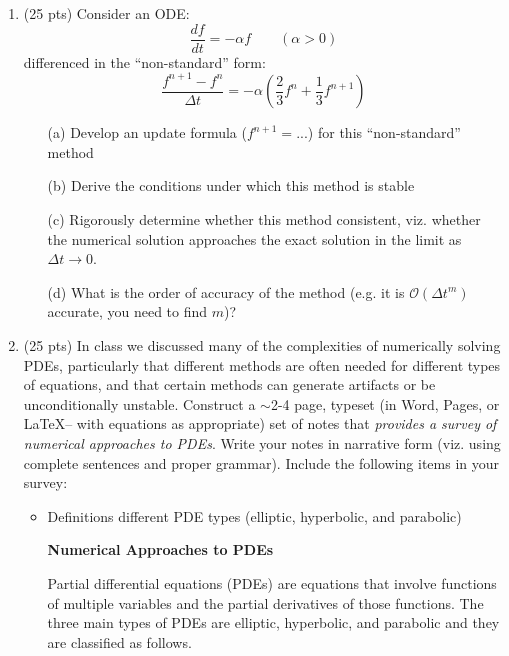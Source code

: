 \documentclass{article}
\begin{document}
\begin{enumerate}

  \item (25 pts) Consider an ODE:  
  \begin{equation}
    \frac{d f}{d t} = -\alpha f \qquad (\alpha > 0)
  \end{equation}
  differenced in the ``non-standard'' form:
  \begin{equation}
    \frac{f^{n+1}-f^n}{\Delta t} = - \alpha \left( \frac{2}{3} f^n + \frac{1}{3} f^{n+1} \right)
  \end{equation}  
  \begin{enumerate}
    \item[(a)] Develop an update formula ($f^{n+1}=...$) for this ``non-standard'' method
    \item[(b)] Derive the conditions under which this method is stable
    \item[(c)] Rigorously determine whether this method consistent, viz. whether the numerical solution approaches the exact solution in the limit as $\Delta t \rightarrow 0$.
    \item[(d)] What is the order of accuracy of the method (e.g. it is $\mathcal{O}(\Delta t^m)$ accurate, you need to find $m$)?
  \end{enumerate}

  \item (25 pts) In class we discussed many of the complexities of numerically solving PDEs, particularly that different methods are often needed for different types of equations, and that certain methods can generate artifacts or be unconditionally unstable.  Construct a $\sim$2-4 page, typeset (in Word, Pages, or \LaTeX -- with equations as appropriate) set of notes that \emph{provides a survey of numerical approaches to PDEs}.  Write your notes in narrative form (viz. using complete sentences and proper grammar). Include the following items in your survey:
    \begin{itemize}
      \item Definitions different PDE types (elliptic, hyperbolic, and parabolic)
      
      \textbf{Numerical Approaches to PDEs}
      
      Partial differential equations (PDEs) are equations that involve functions of multiple variables and the partial derivatives of those functions. The three main types of PDEs are elliptic, hyperbolic, and parabolic and they are classified as follows.
      

\end{itemize}
\end{enumerate}
\end{document}
